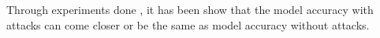 Through experiments done \cite{spectral}, it has been show that the model accuracy with attacks can come closer or be the same as model accuracy without attacks.


















